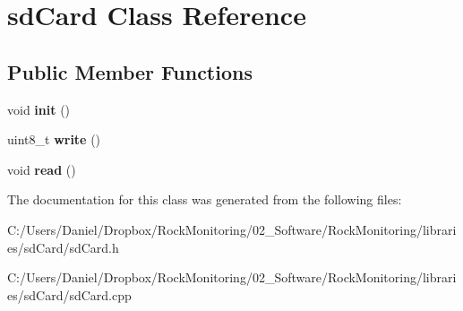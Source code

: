 \hypertarget{classsd_card}{}\section{sd\+Card Class Reference}
\label{classsd_card}
\subsection*{Public Member Functions}
\begin{DoxyCompactItemize}
\item 
void {\bfseries init} ()\hypertarget{classsd_card_aa3d03be0c693754a48c39188d25a800f}{}\label{classsd_card_aa3d03be0c693754a48c39188d25a800f}

\item 
uint8\+\_\+t {\bfseries write} ()\hypertarget{classsd_card_a909b24f1b21d4650de1dad5a4f57a9ed}{}\label{classsd_card_a909b24f1b21d4650de1dad5a4f57a9ed}

\item 
void {\bfseries read} ()\hypertarget{classsd_card_a159107cde4a1787e611cb606759561b4}{}\label{classsd_card_a159107cde4a1787e611cb606759561b4}

\end{DoxyCompactItemize}


The documentation for this class was generated from the following files\+:\begin{DoxyCompactItemize}
\item 
C\+:/\+Users/\+Daniel/\+Dropbox/\+Rock\+Monitoring/02\+\_\+\+Software/\+Rock\+Monitoring/libraries/sd\+Card/sd\+Card.\+h\item 
C\+:/\+Users/\+Daniel/\+Dropbox/\+Rock\+Monitoring/02\+\_\+\+Software/\+Rock\+Monitoring/libraries/sd\+Card/sd\+Card.\+cpp\end{DoxyCompactItemize}
